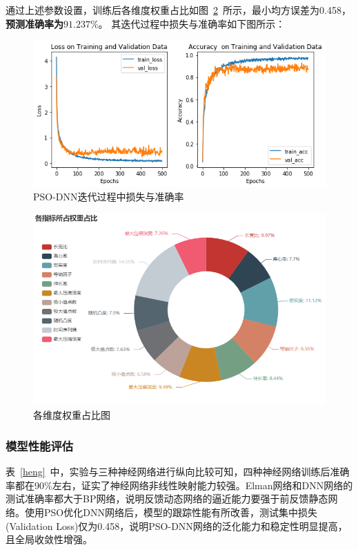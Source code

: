 \documentclass{whutmod}
\begin{document}
	通过上述参数设置，训练后各维度权重占比如图~\ref{quanzhong}~所示，最小均方误差为0.458，\textbf{预测准确率为$91.237\%$}。
	其迭代过程中损失与准确率如下图所示：
	\begin{figure}[H]
		\centering
		\includegraphics[width=\textwidth]{figures/x.png}
		\caption{PSO-DNN迭代过程中损失与准确率}\label{xxx}
	\end{figure}

	\begin{figure}[H]
	\centering
	\includegraphics[width=\textwidth]{figures/quanzhong2.png}
	\caption{各维度权重占比图}\label{quanzhong}
\end{figure}
	\subsubsection{模型性能评估}
	表~\ref{heng}~中，实验与三种神经网络进行纵向比较可知，四种神经网络训练后准确率都在90\%左右，证实了神经网络非线性映射能力较强。Elman网络和DNN网络的测试准确率都大于BP网络，说明反馈动态网络的逼近能力要强于前反馈静态网络。使用PSO优化DNN网络后，模型的跟踪性能有所改善，测试集中损失(Validation Loss)仅为0.458，说明PSO-DNN网络的泛化能力和稳定性明显提高，且全局收敛性增强。
	
\end{document}
